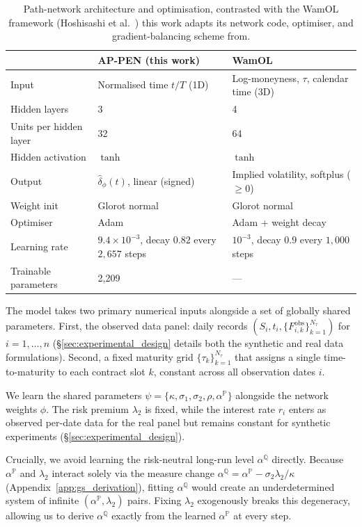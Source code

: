 \documentclass[sigconf, authorversion=true, nonacm=true]{acmart}
\begin{document}
\begin{table}[tbp]
\centering
\footnotesize
\caption{Path-network architecture and optimisation, contrasted with the WamOL framework (Hoshisashi et al.~\cite{Hoshisashi2024Physics-InformedPDEs, Hoshisashi2024Whack-a-moleSurface}) this work adapts its network code, optimiser, and gradient-balancing scheme from.}
\label{tab:network_arch}
\setlength{\tabcolsep}{3pt}
\begin{tabular}{@{}p{1.65cm}p{2.9cm}p{2.9cm}@{}}
\toprule
 & AP-PEN (this work) & WamOL~\cite{Hoshisashi2024Whack-a-moleSurface} \\
\midrule
Input & Normalised time $t/T$ (1D) & Log-moneyness, $\tau$, calendar time (3D) \\
Hidden layers & 3 & 4 \\
Units per hidden layer & 32 & 64 \\
Hidden activation & $\tanh$ & $\tanh$ \\
Output & $\hat{\delta}_\phi(t)$, linear (signed) & Implied volatility, softplus ($\geq 0$) \\
Weight init & Glorot normal & Glorot normal \\
Optimiser & Adam & Adam + weight decay \\
Learning rate & $9.4\times10^{-3}$, decay $0.82$ every $2{,}657$ steps & $10^{-3}$, decay $0.9$ every $1{,}000$ steps \\
Trainable parameters & 2{,}209 & --- \\
\bottomrule
\end{tabular}
\end{table}

The model takes two primary numerical inputs alongside a set of globally shared parameters. First, the observed data panel: daily records $(S_i, t_i, \{F^{\text{obs}}_{i,k}\}_{k=1}^{N_\tau})$ for $i = 1, \dots, n$ (\S\ref{sec:experimental_design} details both the synthetic and real data formulations). Second, a fixed maturity grid $\{\tau_k\}_{k=1}^{N_\tau}$ that assigns a single time-to-maturity to each contract slot $k$, constant across all observation dates $i$.

We learn the shared parameters $\psi = \{\kappa, \sigma_1, \sigma_2, \rho, \alpha^{\mathbb{P}}\}$ alongside the network weights $\phi$. The risk premium $\lambda_2$ is fixed, while the interest rate $r_i$ enters as observed per-date data for the real panel but remains constant for synthetic experiments (\S\ref{sec:experimental_design}). 

Crucially, we avoid learning the risk-neutral long-run level $\alpha^{\mathbb{Q}}$ directly. Because $\alpha^{\mathbb{P}}$ and $\lambda_2$ interact solely via the measure change $\alpha^{\mathbb{Q}} = \alpha^{\mathbb{P}} - \sigma_2\lambda_2/\kappa$ (Appendix~\ref{app:gs_derivation}), fitting $\alpha^{\mathbb{Q}}$ would create an underdetermined system of infinite $(\alpha^{\mathbb{P}}, \lambda_2)$ pairs. Fixing $\lambda_2$ exogenously breaks this degeneracy, allowing us to derive $\alpha^{\mathbb{Q}}$ exactly from the learned $\alpha^{\mathbb{P}}$ at every step.
\end{document}
